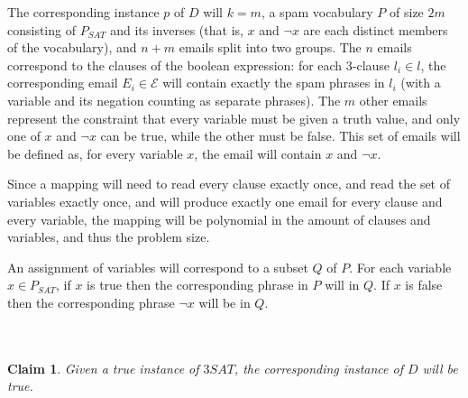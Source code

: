 \documentclass[11pt]{article}
\newtheorem{claim}{Claim}
\begin{document}
    The corresponding instance $p$ of $D$ will $k = m$, a spam vocabulary $P$ of size $2m$ consisting of $P_{SAT}$ and its inverses (that is, $x$ and $\lnot x$ are each distinct members of the vocabulary), and $n + m$ emails split into two groups. The $n$ emails correspond to the clauses of the boolean expression: for each 3-clause $l_i \in l$, the corresponding email $E_i \in \mathcal{E}$ will contain exactly the spam phrases in $l_i$ (with a variable and its negation counting as separate phrases). The $m$ other emails represent the constraint that every variable must be given a truth value, and only one of $x$ and $\neg x$ can be true, while the other must be false. This set of emails will be defined as, for every variable $x$, the email will contain $x$ and $\lnot x$.   

    Since a mapping will need to read every clause exactly once, and read the set of variables exactly once, and will produce exactly one email for every clause and every variable, the mapping will be polynomial in the amount of clauses and variables, and thus the problem size.

    An assignment of variables will correspond to a subset $Q$ of $P$. For each variable $x \in P_{SAT}$, if $x$ is true then the corresponding phrase in $P$ will in $Q$. If $x$ is false then the corresponding phrase $\lnot x$ will be in $Q$. 
 \\
 \\ 
 \\ 

\begin{claim}
    Given a true instance of $3SAT$, the corresponding instance of $D$ will be true.
\end{claim}
\end{document}
